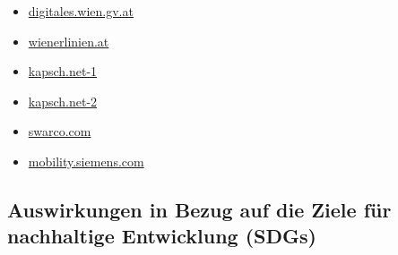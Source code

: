 \documentclass[
]{book}
\providecommand{\tightlist}{%
  \setlength{\itemsep}{0pt}\setlength{\parskip}{0pt}}
\begin{document}
\begin{itemize}
\tightlist
\item
  \href{https://digitales.wien.gv.at/site/open-data/}{digitales.wien.gv.at}
\item
  \href{https://www.wienerlinien.at/eportal3/ep/channelView.do/pageTypeId/66528/channelId/-4400661}{wienerlinien.at}
\item
  \href{https://www.kapsch.net/ktc/Portfolio/IMS/Congestion/Managed-lanes}{kapsch.net-1}
\item
  \href{https://www.kapsch.net/ktc/Portfolio/IMS/Smart-Urban-Mobility/Urban-Mobility-Management}{kapsch.net-2}
\item
  \href{https://www.swarco.com/de/loesungen/oeffentlicher-nahverkehr/vorrang-fuer-den-oeffentlichen-nahverkehr}{swarco.com}
\item
  \href{https://www.mobility.siemens.com/global/de/portfolio/strasse/verkehrsmanagement/auf-der-strasse/smart-detection.html}{mobility.siemens.com}
\end{itemize}

\hypertarget{auswirkungen-in-bezug-auf-die-ziele-fuxfcr-nachhaltige-entwicklung-sdgs-5}{%
\subsection*{Auswirkungen in Bezug auf die Ziele für nachhaltige Entwicklung (SDGs)}\label{auswirkungen-in-bezug-auf-die-ziele-fuxfcr-nachhaltige-entwicklung-sdgs-5}}
\end{document}
